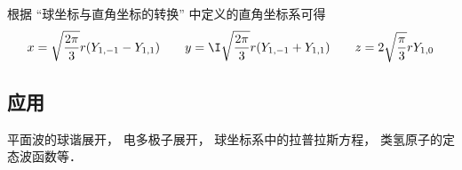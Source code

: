 根据 “球坐标与直角坐标的转换” 中定义的直角坐标系可得
\begin{equation}\label{SphHar_eq4}
x = \sqrt{\frac{2\pi}{3}} r (Y_{1,-1} - Y_{1,1}) \qquad
y = \I \sqrt{\frac{2\pi}{3}} r (Y_{1,-1}+Y_{1,1}) \qquad
z =2\sqrt{\frac{\pi}{3}} rY_{1,0}
\end{equation}

\subsection{应用}
平面波的球谐展开， 电多极子展开， 球坐标系中的拉普拉斯方程， 类氢原子的定态波函数等．
